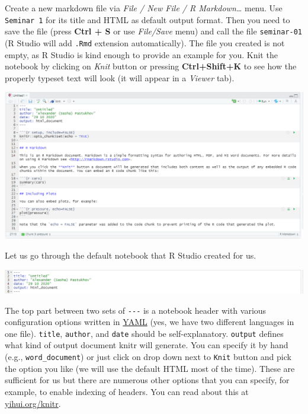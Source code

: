 \documentclass[
]{book}
\begin{document}
Create a new markdown file via \emph{File / New File / R Markdown\ldots{}} menu. Use \texttt{Seminar\ 1} for its title and HTML as default output format. Then you need to save the file (press \textbf{Ctrl + S} or use \emph{File/Save} menu) and call the file \texttt{seminar-01} (R Studio will add \texttt{.Rmd} extension automatically). The file you created is not empty, as R Studio is kind enough to provide an example for you. Knit the notebook by clicking on \emph{Knit} button or pressing \textbf{Ctrl+Shift+K} to see how the properly typeset text will look (it will appear in a \emph{Viewer} tab).

\begin{center}\includegraphics[width=1\linewidth]{images/default-notebook} \end{center}

Let us go through the default notebook that R Studio created for us.

\begin{center}\includegraphics[width=1\linewidth]{images/notebook-header} \end{center}

The top part between two sets of \texttt{-\/-\/-} is a notebook header with various configuration options written in \href{https://yaml.org/}{YAML} (yes, we have two different languages in one file). \texttt{title}, \texttt{author}, and \texttt{date} should be self-explanatory. \texttt{output} defines what kind of output document knitr will generate. You can specify it by hand (e.g., \texttt{word\_document}) or just click on drop down next to \texttt{Knit} button and pick the option you like (we will use the default HTML most of the time). These are sufficient for us but there are numerous other options that you can specify, for example, to enable indexing of headers. You can read about this at \href{https://yihui.org/knitr/}{yihui.org/knitr}.
\end{document}
